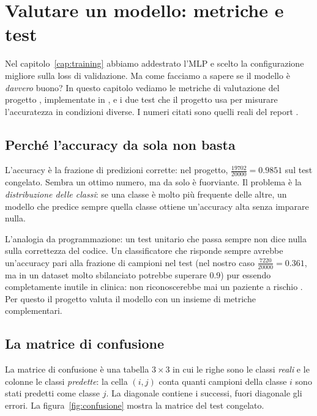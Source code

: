 
\chapter{Valutare un modello: metriche e test}\label{cap:valutazione}

Nel capitolo~\ref{cap:training} abbiamo addestrato l'MLP e scelto la
configurazione migliore sulla loss di validazione. Ma come facciamo a sapere
se il modello è \emph{davvero} buono? In questo capitolo vediamo le metriche
di valutazione del progetto \progetto{}, implementate in
 \cite{knowledge_ml2026}, e i due test che il progetto usa per misurare
l'accuratezza in condizioni diverse. I numeri citati sono quelli reali del
report .

\section{Perché l'accuracy da sola non basta}\label{sec:accuracy-insufficiente}

L'accuracy è la frazione di predizioni corrette: nel progetto,
$\frac{19702}{20000} = 0.9851$ sul test congelato. Sembra un ottimo numero,
ma da solo è fuorviante. Il problema è la \emph{distribuzione delle classi}:
se una classe è molto più frequente delle altre, un modello che predice
sempre quella classe ottiene un'accuracy alta senza imparare nulla.

L'analogia da programmazione: un test unitario che passa sempre non dice
nulla sulla correttezza del codice. Un classificatore che risponde sempre
 avrebbe un'accuracy pari alla frazione di campioni
 nel test (nel nostro caso $\frac{7220}{20000} = 0.361$, ma
in un dataset molto sbilanciato potrebbe superare 0.9) pur essendo
completamente inutile in clinica: non riconoscerebbe mai un paziente a
rischio . Per questo il progetto valuta il modello con un
insieme di metriche complementari.

\section{La matrice di confusione}\label{sec:matrice-confusione}

La matrice di confusione è una tabella $3 \times 3$ in cui le righe sono le
classi \emph{reali} e le colonne le classi \emph{predette}: la cella
$(i, j)$ conta quanti campioni della classe $i$ sono stati predetti come
classe $j$. La diagonale contiene i successi, fuori diagonale gli errori.
La figura~\ref{fig:confusione} mostra la matrice del test congelato.

